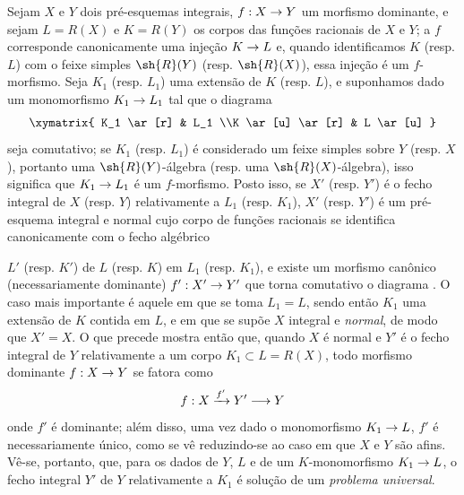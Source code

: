 \documentclass[oneside,10pt]{amsart}
\makeatletter
\newcommand{\ega@arrow}[2]{\mathchoice{#1}{#2}{#2}{#2}}
\renewcommand{\to}{\ega@arrow{\longrightarrow}{\rightarrow}}
\newcommand{\oldpage}[2][]{\marginnote{\normalfont\footnotesize\textbf{#1}~|~#2}\ignorespaces}
\let\EGAOriginalLabel\label
\renewcommand{\label}[1]{\phantomsection\EGAOriginalLabel{#1}}
\makeatother
\begin{document}
\begin{env}[6.3.9]
\label{II.6.3.9}
Sejam $X$ e $Y$ dois pré-esquemas integrais, $f:X\to Y$ um morfismo dominante, e sejam $L=R(X)$ e $K=R(Y)$ os corpos das funções racionais de $X$ e $Y$;
a $f$ corresponde canonicamente uma injeção $K\to L$ e, quando identificamos $K$ (resp. $L$) com o feixe simples $\sh{R}(Y)$ (resp. $\sh{R}(X)$), essa injeção é um $f$-morfismo.
Seja $K_1$ (resp. $L_1$) uma extensão de $K$ (resp. $L$), e suponhamos dado um monomorfismo $K_1\to L_1$ tal que o diagrama
\[
  \xymatrix{
    K_1 \ar[r]
    & L_1
  \\K \ar[u] \ar[r]
    & L \ar[u]
  }
\]
seja comutativo;
se $K_1$ (resp. $L_1$) é considerado um feixe simples sobre $Y$ (resp. $X$), portanto uma $\sh{R}(Y)$-álgebra (resp. uma $\sh{R}(X)$-álgebra), isso significa que $K_1\to L_1$ é um $f$-morfismo.
Posto isso, se $X'$ (resp. $Y'$) é o fecho integral de $X$ (resp. $Y$) relativamente a $L_1$ (resp. $K_1$), $X'$ (resp. $Y'$) é um pré-esquema integral e normal  cujo corpo de funções racionais se identifica canonicamente com o fecho algébrico

\oldpage[II]{120}
$L'$ (resp. $K'$) de $L$ (resp. $K$) em $L_1$ (resp. $K_1$), e existe um morfismo canônico (necessariamente dominante) $f':X'\to Y'$ que torna comutativo o diagrama .
O caso mais importante é aquele em que se toma $L_1=L$, sendo então $K_1$ uma extensão de $K$ contida em $L$, e em que se supõe $X$ integral e \emph{normal}, de modo que $X'=X$.
O que precede mostra então que, quando $X$ é normal e $Y'$ é o fecho integral de $Y$ relativamente a um corpo $K_1\subset L=R(X)$, todo morfismo dominante $f:X\to Y$ se fatora como
\[
  f:X\xrightarrow{f'}Y'\to Y
\]
onde $f'$ é dominante;
além disso, uma vez dado o monomorfismo $K_1\to L$, $f'$ é necessariamente único, como se vê reduzindo-se ao caso em que $X$ e $Y$ são afins.
Vê-se, portanto, que, para os dados de $Y$, $L$ e de um $K$-monomorfismo $K_1\to L$, o fecho integral $Y'$ de $Y$ relativamente a $K_1$ é solução de um \emph{problema universal}.
\end{env}
\end{document}
